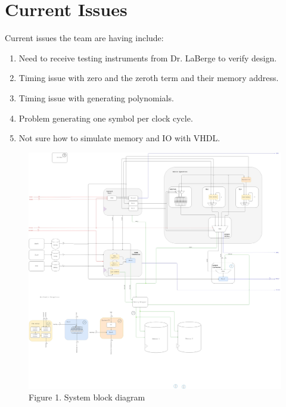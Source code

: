 \documentclass[paper=usletter, fontsize=12pt]{article}
\begin{document}
    \section{Current Issues} Current issues the team are having include: 
	
	\begin{enumerate}[label=\alph*)]
		\item Need to receive testing instruments from Dr. LaBerge to verify design. 
		\item Timing issue with zero and the zeroth term and their memory address.
		\item Timing issue with generating polynomials.		
		\item Problem generating one symbol per clock cycle.
		\item Not sure how to simulate memory and IO with VHDL.
	\end{enumerate}
	
  	\begin{figure}[h!]
  		
  		\includegraphics[scale=0.16]{system_block_diagram}
  		\caption{Figure 1. System block diagram}
  	\end{figure}
   
   
\end{document}
